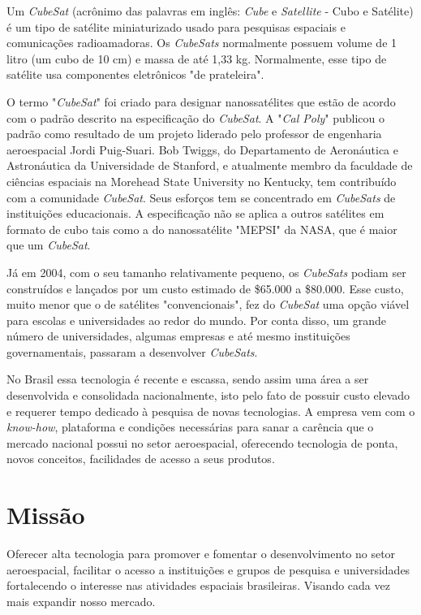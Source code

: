 \documentclass[
	12pt,				%
	openright,			%
	oneside,			%
	a4paper,			%
	english,			%
	french,				%
	spanish,			%
	brazil				%
	]{abntex2}
\begin{document}
	Um \textit{CubeSat} (acrônimo das palavras em inglês: \textit{Cube} e \textit{Satellite} - Cubo e Satélite) é um tipo de satélite miniaturizado usado para pesquisas espaciais e comunicações radioamadoras. Os \textit{CubeSats} normalmente possuem volume de 1 litro (um cubo de 10 cm) e massa de até 1,33 kg. Normalmente, esse tipo de satélite usa componentes eletrônicos "de prateleira".
	
	O termo "\textit{CubeSat}" foi criado para designar nanossatélites que estão de acordo com o padrão descrito na especificação do \textit{CubeSat}. A "\textit{Cal Poly}" publicou o padrão como resultado de um projeto liderado pelo professor de engenharia aeroespacial Jordi Puig-Suari. Bob Twiggs, do Departamento de Aeronáutica e Astronáutica da Universidade de Stanford, e atualmente membro da faculdade de ciências espaciais na Morehead State University no Kentucky, tem contribuído com a comunidade \textit{CubeSat}. Seus esforços tem se concentrado em \textit{CubeSats} de instituições educacionais. A especificação não se aplica a outros satélites em formato de cubo tais como a do nanossatélite "MEPSI" da NASA, que é maior que um \textit{CubeSat}.

	Já em 2004, com o seu tamanho relativamente pequeno, os \textit{CubeSats} podiam ser construídos e lançados por um custo estimado de \$65.000 a \$80.000. Esse custo, muito menor que o de satélites "convencionais", fez do \textit{CubeSat} uma opção viável para escolas e universidades ao redor do mundo. Por conta disso, um grande número de universidades, algumas empresas e até mesmo instituições governamentais, passaram a desenvolver \textit{CubeSats}.
	
	No Brasil essa tecnologia é recente e escassa, sendo assim uma área a ser desenvolvida e consolidada nacionalmente, isto pelo fato de possuir custo elevado e requerer tempo dedicado à pesquisa de novas tecnologias.
A empresa vem com o \textit{know-how}, plataforma e condições necessárias para sanar a carência que o mercado nacional possui no setor aeroespacial, oferecendo tecnologia de ponta, novos conceitos, facilidades de acesso a seus produtos.

\section[Missão]{Missão}
	
	Oferecer alta tecnologia para promover e fomentar o desenvolvimento no setor aeroespacial, facilitar o acesso a instituições e grupos de pesquisa e universidades fortalecendo o interesse nas atividades espaciais brasileiras. Visando cada vez mais expandir nosso mercado.
	
\end{document}
